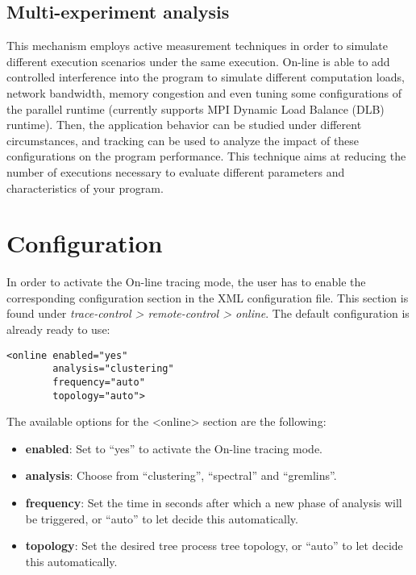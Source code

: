 \subsection{Multi-experiment analysis}

This mechanism employs active measurement techniques in order to simulate different execution scenarios 
under the same execution. \TRACE On-line is able to add controlled 
interference into the program to simulate different computation loads, network bandwidth, memory congestion
and even tuning some configurations of the parallel runtime (currently supports MPI Dynamic Load Balance (DLB)
runtime). Then, the application behavior can be studied under different circumstances, and tracking can be 
used to analyze the impact of these configurations on the program performance.
This technique aims at reducing the number of executions necessary to evaluate different parameters and 
characteristics of your program.


\section{Configuration}
\label{sec:Configuration}

  In order to activate the On-line tracing mode, the user has to enable the corresponding configuration section 
  in the \TRACE XML configuration file. This section is 
  found under \emph{trace-control > remote-control > online}. The default configuration is already 
  ready to use:  

\begin{verbatim}
<online enabled="yes" 
        analysis="clustering" 
        frequency="auto" 
        topology="auto">
\end{verbatim}

  The available options for the <online> section are the following:
  
\begin{itemize}
 \item \textbf{enabled}: Set to ``yes'' to activate the On-line tracing mode.
 \item \textbf{analysis}: Choose from ``clustering'', ``spectral'' and ``gremlins''.
 \item \textbf{frequency}: Set the time in seconds after which a new phase of analysis will be triggered, or ``auto'' to let \TRACE decide this automatically.
 \item \textbf{topology}: Set the desired tree process tree topology, or ``auto'' to let \TRACE decide this automatically.
\end{itemize}

